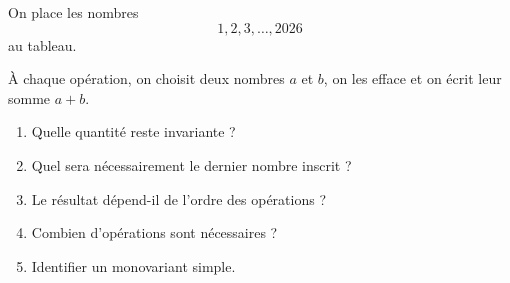 On place les nombres
\[
1, 2, 3, \ldots, 2026
\]
au tableau.

À chaque opération, on choisit deux nombres $a$ et $b$, on les efface et on
écrit leur somme $a + b$.
\begin{enumerate}
  \item Quelle quantité reste invariante ?
  \item Quel sera nécessairement le dernier nombre inscrit ?
  \item Le résultat dépend-il de l'ordre des opérations ?
  \item Combien d'opérations sont nécessaires ?
  \item Identifier un monovariant simple.
\end{enumerate}
